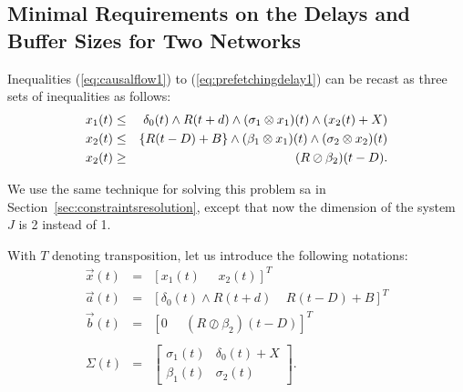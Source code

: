 \subsection{Minimal Requirements on the Delays and Buffer Sizes for Two Networks}

Inequalities (\ref{eq:causalflow1}) to (\ref{eq:prefetchingdelay1}) can be recast as three sets of inequalities as follows:
\begin{eqnarray}
\mylabel{eq:ineqminplus1}
x_1(t) & \leq & \delta_0 (t) \wedge R(t+d) \wedge  (\sigma_1 \otimes x_1)(t) \wedge (x_2(t) + X) \\
\mylabel{eq:ineqminplus2}
x_2(t) & \leq & \{R(t-D) + B \}  \wedge  (\beta_1 \otimes x_1)(t) \wedge  (\sigma_2 \otimes x_2)(t) \\
\mylabel{eq:ineqmaxplus2}
x_2(t) & \geq & (R \oslash \beta_2)(t-D).
\end{eqnarray}

We use the same technique for solving this problem sa in Section~\ref{sec:constraintsresolution},
except that now the dimension of the system $J$ is 2 instead of 1.

With $T$ denoting transposition, let us introduce the following notations:
$$ \begin{array}{rcl}
\vec{x}(t) & = & [ x_1(t) \; \; \; \; \;  x_2(t)  ]^T  \\
\vec{a}(t) & = & [ \delta_0 (t) \wedge R(t+d)  \; \; \; \;  R(t-D) + B ]^T \\
\vec{b}(t) & = & [ 0  \; \; \; \; \; (R \oslash \beta_2)(t-D) ]^T \\ \\
\Sigma(t) & = & \left[ \begin{array}{cc} \sigma_1(t) & \delta_0(t) + X \\
                    \beta_1(t) & \sigma_2(t)  \end{array} \right].
\end{array} $$

